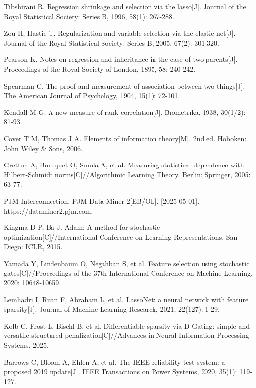 Tibshirani R. Regression shrinkage and selection via the lasso[J]. Journal of the Royal Statistical Society: Series B, 1996, 58(1): 267-288.

Zou H, Hastie T. Regularization and variable selection via the elastic net[J]. Journal of the Royal Statistical Society: Series B, 2005, 67(2): 301-320.

Pearson K. Notes on regression and inheritance in the case of two parents[J]. Proceedings of the Royal Society of London, 1895, 58: 240-242.

Spearman C. The proof and measurement of association between two things[J]. The American Journal of Psychology, 1904, 15(1): 72-101.

Kendall M G. A new measure of rank correlation[J]. Biometrika, 1938, 30(1/2): 81-93.

Cover T M, Thomas J A. Elements of information theory[M]. 2nd ed. Hoboken: John Wiley \& Sons, 2006.

Gretton A, Bousquet O, Smola A, et al. Measuring statistical dependence with Hilbert-Schmidt norms[C]//Algorithmic Learning Theory. Berlin: Springer, 2005: 63-77.

PJM Interconnection. PJM Data Miner 2[EB/OL]. [2025-05-01]. https://dataminer2.pjm.com.

Kingma D P, Ba J. Adam: A method for stochastic optimization[C]//International Conference on Learning Representations. San Diego: ICLR, 2015.

Yamada Y, Lindenbaum O, Negahban S, et al. Feature selection using stochastic gates[C]//Proceedings of the 37th International Conference on Machine Learning. 2020: 10648-10659.

Lemhadri I, Ruan F, Abraham L, et al. LassoNet: a neural network with feature sparsity[J]. Journal of Machine Learning Research, 2021, 22(127): 1-29.

Kolb C, Frost L, Bischl B, et al. Differentiable sparsity via D-Gating: simple and versatile structured penalization[C]//Advances in Neural Information Processing Systems. 2025.

Barrows C, Bloom A, Ehlen A, et al. The IEEE reliability test system: a proposed 2019 update[J]. IEEE Transactions on Power Systems, 2020, 35(1): 119-127.
